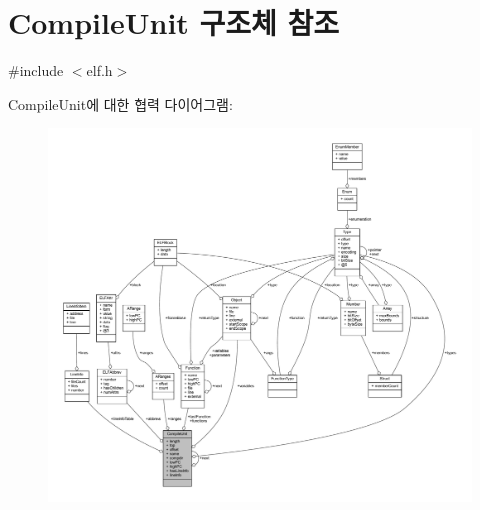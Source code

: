 \hypertarget{struct_compile_unit}{}\section{Compile\+Unit 구조체 참조}
\label{struct_compile_unit}


{\ttfamily \#include $<$elf.\+h$>$}



Compile\+Unit에 대한 협력 다이어그램\+:\nopagebreak
\begin{figure}[H]
\begin{center}
\leavevmode
\includegraphics[width=350pt]{struct_compile_unit__coll__graph}
\end{center}
\end{figure}
